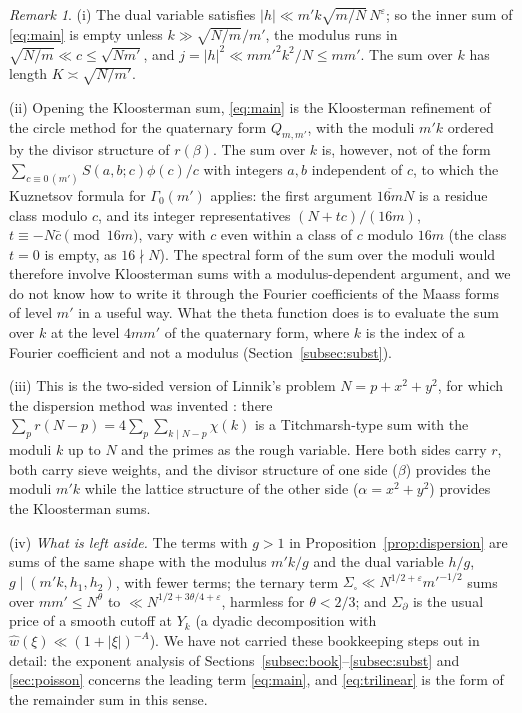 \documentclass[11pt]{amsart}
\theoremstyle{remark}
\newtheorem{remark}[theorem]{Remark}
\newcommand{\e}{\varepsilon}
\begin{document}
\begin{remark}\label{rem:disp}
(i) The dual variable satisfies $|h|\ll m'k\sqrt{m/N}\,N^\e$; so the inner sum of \eqref{eq:main} is empty unless $k\gg\sqrt{N/m}/m'$, the modulus runs in $\sqrt{N/m}\ll c\le\sqrt{Nm'}$, and $j=|h|^2\ll mm'^2k^2/N\le mm'$. The sum over $k$ has length $K\asymp\sqrt{N/m'}$.

(ii) Opening the Kloosterman sum, \eqref{eq:main} is the Kloosterman refinement of the circle method for the quaternary form $Q_{m,m'}$, with the moduli $m'k$ ordered by the divisor structure of $r(\beta)$. The sum over $k$ is, however, not of the form $\sum_{c\equiv0\,(m')}S(a,b;c)\phi(c)/c$ with integers $a,b$ independent of $c$, to which the Kuznetsov formula for $\Gamma_0(m')$ applies: the first argument $\overline{16m}N$ is a residue class modulo $c$, and its integer representatives $(N+tc)/(16m)$, $t\equiv-N\bar c\pmod{16m}$, vary with $c$ even within a class of $c$ modulo $16m$ (the class $t=0$ is empty, as $16\nmid N$). The spectral form of the sum over the moduli would therefore involve Kloosterman sums with a modulus-dependent argument, and we do not know how to write it through the Fourier coefficients of the Maass forms of level $m'$ in a useful way. What the theta function does is to evaluate the sum over $k$ at the level $4mm'$ of the quaternary form, where $k$ is the index of a Fourier coefficient and not a modulus (Section~\ref{subsec:subst}).

(iii) This is the two-sided version of Linnik's problem $N=p+x^2+y^2$, for which the dispersion method was invented \cite{Linnik}: there $\sum_pr(N-p)=4\sum_p\sum_{k\mid N-p}\chi(k)$ is a Titchmarsh-type sum with the moduli $k$ up to $N$ and the primes as the rough variable. Here both sides carry $r$, both carry sieve weights, and the divisor structure of one side ($\beta$) provides the moduli $m'k$ while the lattice structure of the other side ($\alpha=x^2+y^2$) provides the Kloosterman sums.

(iv) \emph{What is left aside.} The terms with $g>1$ in Proposition~\ref{prop:dispersion} are sums of the same shape with the modulus $m'k/g$ and the dual variable $h/g$, $g\mid(m'k,h_1,h_2)$, with fewer terms; the ternary term $\Sigma_\square\ll N^{1/2+\e}m'^{-1/2}$ sums over $mm'\le N^\theta$ to $\ll N^{1/2+3\theta/4+\e}$, harmless for $\theta<2/3$; and $\Sigma_\partial$ is the usual price of a smooth cutoff at $Y_k$ (a dyadic decomposition with $\hat w(\xi)\ll(1+|\xi|)^{-A}$). We have not carried these bookkeeping steps out in detail: the exponent analysis of Sections~\ref{subsec:book}--\ref{subsec:subst} and \ref{sec:poisson} concerns the leading term \eqref{eq:main}, and \eqref{eq:trilinear} is the form of the remainder sum in this sense.
\end{remark}
\end{document}
